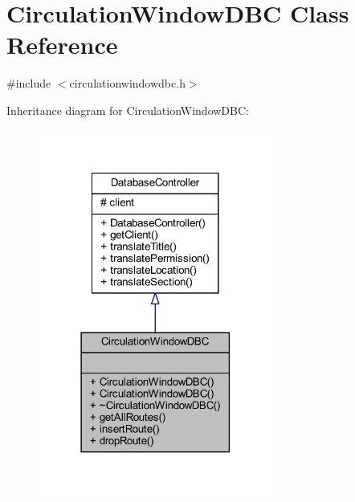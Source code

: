 \hypertarget{class_circulation_window_d_b_c}{}\section{Circulation\+Window\+D\+B\+C Class Reference}
\label{class_circulation_window_d_b_c}


{\ttfamily \#include $<$circulationwindowdbc.\+h$>$}



Inheritance diagram for Circulation\+Window\+D\+B\+C\+:
\nopagebreak
\begin{figure}[H]
\begin{center}
\leavevmode
\includegraphics[width=218pt]{class_circulation_window_d_b_c__inherit__graph}
\end{center}
\end{figure}


